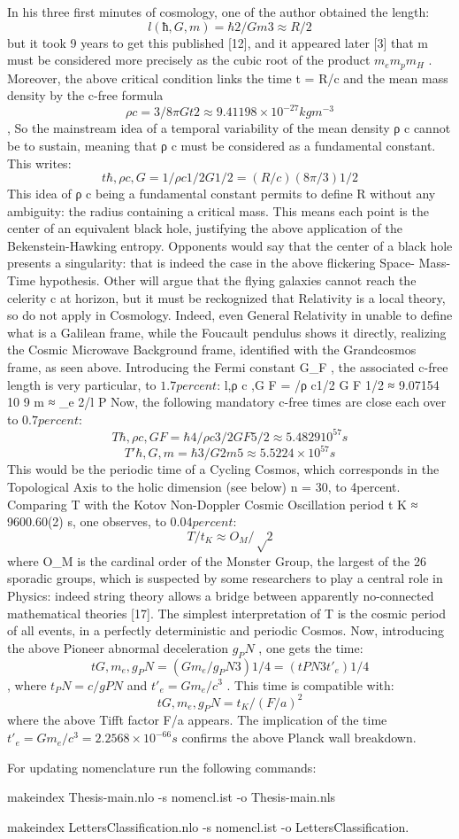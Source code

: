 In his three first minutes of cosmology, one of the author obtained the length:
$$l (ħ,G,m) = \hbar 2 /Gm 3 ≈ R/2$$
but it took 9 years to get this published [12], and it appeared later [3] that m must be considered more precisely as the cubic root of the product $m_e m_p m_H$ . Moreover, the above critical condition
links the time t = R/c and the mean mass density by the c-free formula $$ρ c = 3/8\pi Gt2 ≈ 9.41198 \times
10^{-27} kg m^{-3}$$ , So the mainstream idea of a temporal variability of the mean density ρ c cannot be to
sustain, meaning that ρ c must be considered as a fundamental constant. This writes:
$$t{\hbar,ρ c ,G} = 1/ρ c1/2 G 1/2 = (R/c) (8\pi/3) 1/2$$
This idea of ρ c being a fundamental constant permits to define R without any ambiguity: the
radius containing a critical mass. This means each point is the center of an equivalent black hole,
justifying the above application of the Bekenstein-Hawking entropy. Opponents would say that the
center of a black hole presents a singularity: that is indeed the case in the above flickering Space-
Mass-Time hypothesis. Other will argue that the flying galaxies cannot reach the celerity c at
horizon, but it must be reckognized that Relativity is a local theory, so do not apply in Cosmology.
Indeed, even General Relativity in unable to define what is a Galilean frame, while the Foucault
pendulus shows it directly, realizing the Cosmic Microwave Background frame, identified with the
Grandcosmos frame, as seen above.
Introducing the Fermi constant G_F , the associated c-free length is very particular, to $1.7{percent}$:
l{\hbar,ρ c ,G F } = \hbar/ρ c1/2 G F 1/2 ≈ 9.07154 10 9 m ≈ \lambdabar_e 2/l P
Now, the following mandatory c-free times are close each over to $0.7{percent}$:
$$T{\hbar,ρ c ,G F } = \hbar 4 /ρ c3/2 G F 5/2 ≈ 5.4829 10^{57} s$$
$$T'{\hbar,G,m} = \hbar 3 /G 2 m 5 ≈ 5.5224 \times 10^{57} s$$
This would be the periodic time of a Cycling Cosmos, which corresponds in the Topological Axis to
the holic dimension (see below) n = 30, to 4{percent}. Comparing T with the Kotov Non-Doppler Cosmic
Oscillation period t K ≈ 9600.60(2) s, one observes, to $0.04{percent}$:
$$T/t_K ≈ O_M /√2$$
where O_M is the cardinal order of the Monster Group, the largest of the 26 sporadic groups, which is
suspected by some researchers to play a central role in Physics: indeed string theory allows a bridge
between apparently no-connected mathematical theories [17]. The simplest interpretation of T is the
cosmic period of all events, in a perfectly deterministic and periodic Cosmos.
Now, introducing the above Pioneer abnormal deceleration $g_PN$ , one gets the time: $$t{G, m_e , g_PN }
= (Gm_e /g_PN 3 ) 1/4 = (t PN 3 t'_e ) 1/4$$ , where $t_PN = c/g PN$ and $t'_e = Gm_e /c^3$ . This time is compatible with:
$$t{G, m_e , g_PN } = t_K /(F/a)^2$$
where the above Tifft factor F/a appears. The implication of the time $t'_e = Gm_e /c^3 = 2.2568 \times 10^{-66} s$
confirms the above Planck wall breakdown.

For updating nomenclature run the following commands:

makeindex Thesis-main.nlo -s nomencl.ist -o Thesis-main.nls

makeindex LettersClassification.nlo -s nomencl.ist -o LettersClassification.

